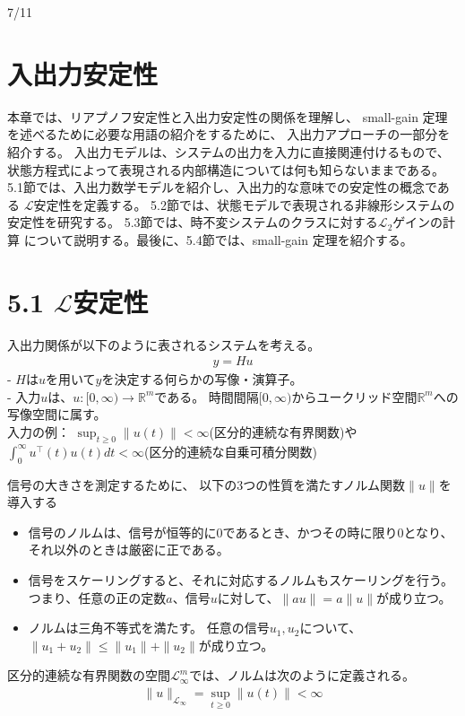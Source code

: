 \documentclass{jsarticle}
\begin{document}
7/11

\section*{入出力安定性}

本章では、リアプノフ安定性と入出力安定性の関係を理解し、
small-gain 定理を述べるために必要な用語の紹介をするために、
入出力アプローチの一部分を紹介する。
入出力モデルは、システムの出力を入力に直接関連付けるもので、
状態方程式によって表現される内部構造については何も知らないままである。
5.1節では、入出力数学モデルを紹介し、入出力的な意味での安定性の概念である
$\mathcal L$安定性を定義する。
5.2節では、状態モデルで表現される非線形システムの安定性を研究する。
5.3節では、時不変システムのクラスに対する$\mathcal L_2$ゲインの計算
について説明する。最後に、5.4節では、small-gain 定理を紹介する。

\section*{5.1 $\mathcal L$安定性}

入出力関係が以下のように表されるシステムを考える。
\begin{align}
  y = Hu
\end{align}
- $H$は$u$を用いて$y$を決定する何らかの写像・演算子。\\
- 入力$u$は、$u\colon [0,\infty)\rightarrow \mathbb R^m$である。
時間間隔$[0,\infty)$からユークリッド空間$\mathbb R^m$への写像空間に属す。\\
入力の例：
$\sup_{t\geq 0} \|u(t)\|<\infty$(区分的連続な有界関数)や$\int^\infty_0 u^\top(t)u(t) dt <\infty $(区分的連続な自乗可積分関数)


信号の大きさを測定するために、
以下の3つの性質を満たすノルム関数$\|u\|$を導入する
\begin{itemize}
  \item 信号のノルムは、信号が恒等的に0であるとき、かつその時に限り0となり、
  それ以外のときは厳密に正である。
  \item 信号をスケーリングすると、それに対応するノルムもスケーリングを行う。
  つまり、任意の正の定数$a$、信号$u$に対して、$\|au\|=a\|u\|$が成り立つ。
  \item ノルムは三角不等式を満たす。
  任意の信号$u_1,u_2$について、$\|u_1+u_2\|\leq \|u_1\|+\|u_2\|$が成り立つ。
\end{itemize}

区分的連続な有界関数の空間$\mathcal L^m_\infty$では、ノルムは次のように定義される。
\begin{align}
  \|u\|_{\mathcal L_\infty} = \sup_{t\geq 0}\|u(t)\| <\infty
\end{align}
\end{document}
